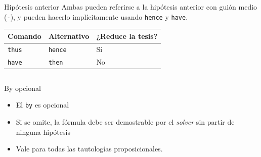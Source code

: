 \documentclass[xcolor={dvipsnames},spanish]{beamer}
\begin{document}
\begin{frame}[fragile]{Hipótesis anterior}
    Ambas pueden referirse a la hipótesis anterior con guión medio
    (\lstinline{-}), y pueden hacerlo implícitamente usando \lstinline{hence} y
    \lstinline{have}.

    \begin{table}[H]
        \centering
    \begin{tabular}{l|l|l}
    Comando             & Alternativo             & ¿Reduce la tesis? \\
    \hline
    \lstinline|thus|    & \lstinline|hence|       & Sí               \\
    \lstinline|have|    & \lstinline|then|        & No              
    \end{tabular}
    \end{table}

    \begin{columns}
        \begin{column}{0.5\textwidth}
        
        \end{column}
        \begin{column}{0.5\textwidth}
            
        \end{column}
    \end{columns}
\end{frame}

\begin{frame}[fragile]{By opcional}
    \begin{itemize}
        \item El \lstinline{by} es opcional
        \item Si se omite, la fórmula debe ser
        demostrable por el \textit{solver} sin partir de ninguna hipótesis
        \item Vale para todas las tautologías proposicionales.
    \end{itemize}

    
\end{frame}
\end{document}

